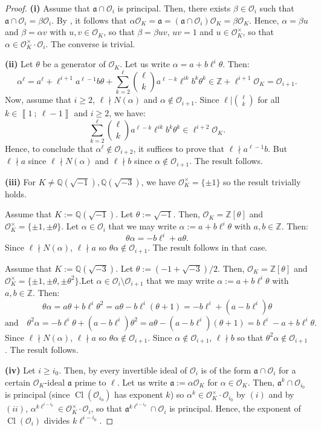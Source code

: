 \documentclass[a4paper,10pt,notitlepage]{report}
\theoremstyle{definition}
\theoremstyle{plain}
\theoremstyle{definition}
\newcommand{\Z}{\mathbb{Z}}
\newcommand{\Q}{\mathbb{Q}}
\newcommand{\mO}{\mathcal{O}}
\renewcommand{\i}[2]{\left\llbracket #1~;~#2\right\rrbracket}
\renewcommand{\(}{\left(}
\renewcommand{\)}{\right)}
\newcommand{\mf}[1]{\mathfrak{#1}}
\DeclareMathOperator{\Cl}{Cl}
\begin{document}
\begin{proof}

\textbf{(i)} Assume that $\mf{a}\cap\mO_i$ is principal. Then, there exists $\beta\in\mO_i$ such that $\mf{a}\cap\mO_i=\beta\mO_i$.  By \cite[Proposition 7.20]{Cox}, it follows that $\alpha\mO_K=\mf{a}=(\mf{a}\cap\mO_i)\mO_K=\beta\mO_K$. Hence, $\alpha=\beta u$ and $\beta=\alpha v$ with $u, v\in\mO_K$, so that $\beta=\beta uv$, $uv=1$ and $u\in\mO_K^\times$, so that $\alpha\in\mO_K^\times\cdot \mO_i$. The converse is trivial.

\textbf{(ii)} Let $\theta$ be a generator of $\mO_K$. Let us write $\alpha=a+b\ell^i\theta$.  Then:
\[\alpha^\ell=a^\ell+\ell^{i+1}a^{\ell-1}b\theta+\sum_{k=2}^\ell\binom{\ell}{k}a^{\ell-k}\ell^{ik}b^k\theta^k\in \Z+\ell^{i+1}\mO_K=\mO_{i+1}.\]
Now, assume that $i\geq 2$, $\ell\nmid N(\alpha)$ and $\alpha\not\in\mO_{i+1}$. Since $\ell|\binom{\ell}{k}$ for all $k\in\i{1}{\ell-1}$ and $i\geq 2$, we have:
\[\sum_{k=2}^\ell\binom{\ell}{k}a^{\ell-k}\ell^{ik}b^k\theta^k\in\ell^{i+2}\mO_K.\]
Hence, to conclude that $\alpha^\ell\not\in\mO_{i+2}$, it suffices to prove that $\ell\nmid a^{\ell-1}b$. But $\ell\nmid a$ since $\ell\nmid N(\alpha)$ and $\ell\nmid b$ since $\alpha\not\in\mO_{i+1}$. The result follows.

\textbf{(iii)} For $K\neq \Q(\sqrt{-1}), \Q(\sqrt{-3})$, we have $\mO_K^\times=\{\pm 1\}$ so the result trivially holds.

Assume that $K:=\Q(\sqrt{-1})$. Let $\theta:=\sqrt{-1}$. Then, $\mO_K=\Z[\theta]$ and $\mO_K^\times=\{\pm 1,\pm\theta\}$.  Let $\alpha\in\mO_{i}$ that we may write $\alpha:=a+b\ell^{i}\theta$ with $a,b\in\Z$. Then:
\[\theta\alpha=-b\ell^{i}+a\theta.\]
Since $\ell\nmid N(\alpha)$, $\ell\nmid a$ so $\theta\alpha\not\in\mO_{i+1}$.  The result follows in that case.

Assume that $K:=\Q(\sqrt{-3})$. Let $\theta:=(-1+\sqrt{-3})/2$. Then, $\mO_K=\Z[\theta]$ and $\mO_K^\times=\{\pm 1,\pm\theta,\pm\theta^2\}$.Let $\alpha\in\mO_{i}\setminus\mO_{i+1}$ that we may write $\alpha:=a+b\ell^{i}\theta$ with $a,b\in\Z$. Then:
\[\theta\alpha=a\theta+b\ell^i\theta^2=a\theta-b\ell^i(\theta+1)=-b\ell^i+(a-b\ell^i)\theta\]
\[\mbox{and} \quad \theta^2\alpha=-b\ell^i\theta+(a-b\ell^i)\theta^2=a\theta-(a-b\ell^i)(\theta+1)=b\ell^i-a+b\ell^i\theta.\]
Since $\ell\nmid N(\alpha)$, $\ell\nmid a$ so $\theta\alpha\not\in\mO_{i+1}$.  Since $\alpha\not\in\mO_{i+1}$, $\ell\nmid b$ so that $\theta^2\alpha\not\in\mO_{i+1}$. The result follows.

\textbf{(iv)} Let $i\geq i_0$. Then, by \cite[Proposition 7.20]{Cox} every invertible ideal of $\mO_i$ is of the form  $\mf{a}\cap\mO_i$ for a certain $\mO_K$-ideal $\mf{a}$ prime to $\ell$.  Let us write $\mf{a}:=\alpha\mO_K$ for $\alpha\in\mO_K$. Then, $\mf{a}^k\cap\mO_{i_0}$ is principal (since $\Cl(\mO_{i_0})$ has exponent $k$) so $\alpha^{k}\in\mO_K^\times\cdot \mO_{i_0}$ by $(i)$ and by $(ii)$, $\alpha^{k\ell^{i-i_0}}\in\mO_K^\times\cdot\mO_i$, so that $\mf{a}^{k\ell^{i-i_0}}\cap\mO_i$ is principal. Hence, the exponent of $\Cl(\mO_i)$ divides $k\ell^{i-i_0}$. 


\end{proof}
\end{document}
